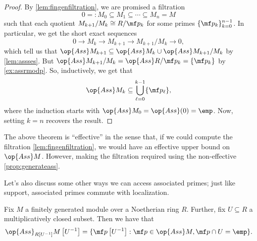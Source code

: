 \begin{proof}
	By \autoref{lem:fingenfiltration}, we are promised a filtration
	\[0=:M_0\subseteq M_1\subseteq\cdots\subseteq M_n=M\]
	such that each quotient $M_{k+1}/M_k\cong R/\mf p_k$ for some primes $\{\mf p_k\}_{k=0}^{n-1}$. In particular, we get the short exact sequences
	\[0\to M_k\to M_{k+1}\to M_{k+1}/M_k\to0,\]
	which tell us that $\op{Ass}M_{k+1}\subseteq\op{Ass}M_k\cup\op{Ass}M_{k+1}/M_k$ by \autoref{lem:assses}. But $\op{Ass}M_{k+1}/M_k=\op{Ass}R/\mf p_k=\{\mf p_k\}$ by \autoref{ex:assrmodp}. So, inductively, we get that
	\[\op{Ass}M_k\subseteq\bigcup_{\ell=0}^{k-1}\{\mf p_\ell\},\]
	where the induction starts with $\op{Ass}M_0=\op{Ass}(0)=\emp$. Now, setting $k=n$ recovers the result.
\end{proof}
\begin{remark}[Nir]
	The above theorem is ``effective'' in the sense that, if we could compute the filtration \autoref{lem:fingenfiltration}, we would have an effective upper bound on $\op{Ass}M$. However, making the filtration required using the non-effective \autoref{prop:generateass}.
\end{remark}
Let's also discuss some other ways we can access associated primes; just like support, associated primes commute with localization.
\begin{proposition} \label{prop:localizeass}
	Fix $M$ a finitely generated module over a Noetherian ring $R$. Further, fix $U\subseteq R$ a multiplicatively closed subset. Then we have that
	\[\op{Ass}_{R\left[U^{-1}\right]}M\left[U^{-1}\right]=\{\mf p\left[U^{-1}\right]:\mf p\in\op{Ass}M,\mf p\cap U=\emp\}.\]
\end{proposition}
